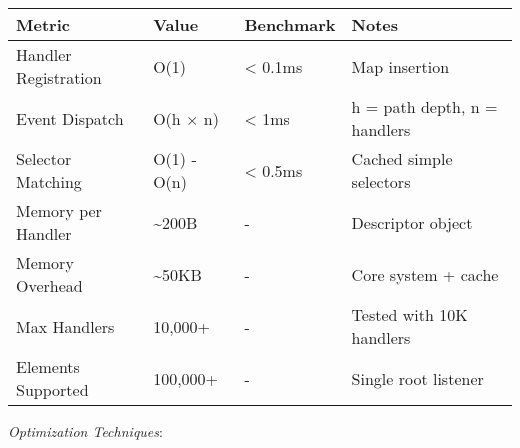 \documentclass[11pt]{article}
\begin{document}
\begin{center}
\begin{tabular}{llll}
Metric & Value & Benchmark & Notes\\
\hline
Handler Registration & O(1) & < 0.1ms & Map insertion\\
Event Dispatch & O(h × n) & < 1ms & h = path depth, n = handlers\\
Selector Matching & O(1) - O(n) & < 0.5ms & Cached simple selectors\\
Memory per Handler & \textasciitilde{}200B & - & Descriptor object\\
Memory Overhead & \textasciitilde{}50KB & - & Core system + cache\\
Max Handlers & 10,000+ & - & Tested with 10K handlers\\
Elements Supported & 100,000+ & - & Single root listener\\
\end{tabular}
\end{center}

\emph{Optimization Techniques}:
\end{document}
